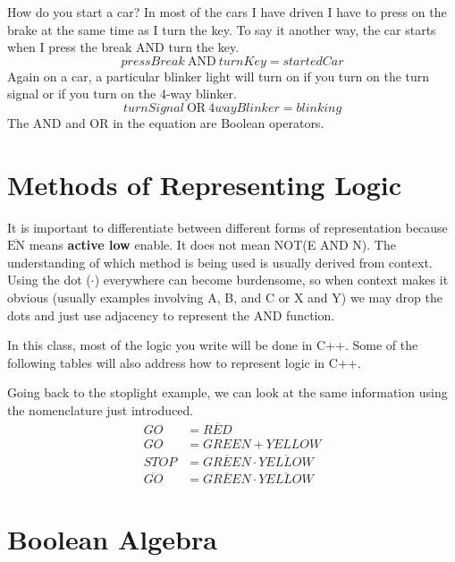 How do you start a car? In most of the cars I have driven I have to press on the brake at the 
same time as I turn the key. To say it another way, the car starts when I press the break
AND turn the key.
\begin{equation}
	pressBreak \: \mathrm{AND} \: turnKey = startedCar
\end{equation}
Again on a car, a particular blinker light will turn on if you turn on the turn signal or if you turn on the 4-way blinker.
\begin{equation}
	turnSignal \: \mathrm{OR} \: 4wayBlinker = blinking
\end{equation}
The AND and OR in the equation are Boolean operators. 

\section{Methods of Representing Logic}
It is important to differentiate between different forms of representation because $\overline{\mathrm{EN}}$
means \textbf{active low} enable. It does not mean NOT(E AND N). The understanding of which method is being 
used is usually derived from context. Using the dot ($\cdot$) everywhere can become burdensome, so when context
makes it obvious (usually examples involving A, B, and C or X and Y) we may drop the dots and just use adjacency to represent
the AND function.

In this class, most of the logic you write will be done in C++. Some of the following tables will also
address how to represent logic in C++.

Going back to the stoplight example, we can look at the same information using the nomenclature just 
introduced.
\begin{subequations}
    \begin{align}
    GO &= \overline{RED} \\
    GO &= GREEN + YELLOW \\
    STOP &= \overline{GREEN}\cdot\overline{YELLOW} \\
    \overline{GO} &= \overline{GREEN}\cdot\overline{YELLOW}
    \end{align}
\end{subequations}

\section{Boolean Algebra}

